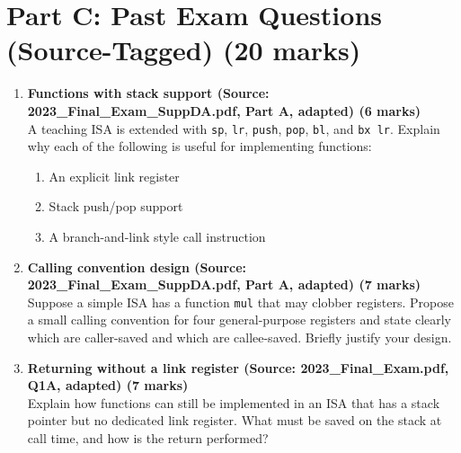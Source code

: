\documentclass[11pt]{article}
\begin{document}
\section*{Part C: Past Exam Questions (Source-Tagged) (20 marks)}
\begin{enumerate}[label=\textbf{C\arabic*.}]
  \item \textbf{Functions with stack support (Source: 2023\_Final\_Exam\_SuppDA.pdf, Part A, adapted) (6 marks)}\\
  A teaching ISA is extended with \texttt{sp}, \texttt{lr}, \texttt{push}, \texttt{pop}, \texttt{bl}, and \texttt{bx lr}. Explain why each of the following is useful for implementing functions:
  \begin{enumerate}[label=(\alph*)]
    \item An explicit link register
    \item Stack push/pop support
    \item A branch-and-link style call instruction
  \end{enumerate}

  \item \textbf{Calling convention design (Source: 2023\_Final\_Exam\_SuppDA.pdf, Part A, adapted) (7 marks)}\\
  Suppose a simple ISA has a function \texttt{mul} that may clobber registers. Propose a small calling convention for four general-purpose registers and state clearly which are caller-saved and which are callee-saved. Briefly justify your design.

  \item \textbf{Returning without a link register (Source: 2023\_Final\_Exam.pdf, Q1A, adapted) (7 marks)}\\
  Explain how functions can still be implemented in an ISA that has a stack pointer but no dedicated link register. What must be saved on the stack at call time, and how is the return performed?
\end{enumerate}
\end{document}
